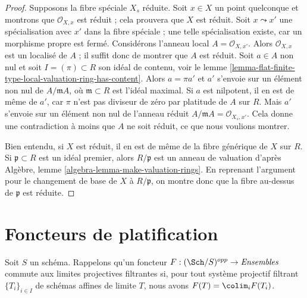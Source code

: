 \begin{proof}
Supposons la fibre spéciale $X_s$ réduite.
Soit $x \in X$ un point quelconque et montrons que $\mathcal{O}_{X, x}$
est réduit ; cela prouvera que $X$ est réduit.
Soit $x \leadsto x'$ une spécialisation avec $x'$
dans la fibre spéciale ; une telle spécialisation existe,
car un morphisme propre est fermé. Considérons l'anneau
local $A = \mathcal{O}_{X, x'}$. Alors $\mathcal{O}_{X, x}$
est un localisé de $A$ ; il suffit donc de montrer que
$A$ est réduit. Soit $a \in A$ non nul et soit $I = (\pi) \subset R$ son
idéal de contenu, voir le
lemme \ref{lemma-flat-finite-type-local-valuation-ring-has-content}.
Alors $a = \pi a'$ et $a'$ s'envoie sur un élément non nul de
$A/\mathfrak mA$, où $\mathfrak m \subset R$ est l'idéal maximal.
Si $a$ est nilpotent, il en est de même de $a'$, car $\pi$ n'est pas diviseur de zéro
par platitude de $A$ sur $R$.
Mais $a'$ s'envoie sur un élément non nul de l'anneau réduit
$A/\mathfrak m A = \mathcal{O}_{X_s, x'}$.
Cela donne une contradiction à moins que $A$ ne soit réduit, ce
que nous voulions montrer.

\medskip\noindent
Bien entendu, si $X$ est réduit, il en est de même de la fibre générique de $X$ sur $R$.
Si $\mathfrak p \subset R$ est un
idéal premier, alors $R/\mathfrak p$ est un anneau de valuation d'après
Algèbre, lemme \ref{algebra-lemma-make-valuation-rings}.
En reprenant l'argument pour le changement de base de $X$
à $R/\mathfrak p$, on montre donc que la fibre au-dessus de $\mathfrak p$
est réduite.
\end{proof}






\section{Foncteurs de platification}
\label{section-flattening-functors}

\noindent
Soit $S$ un schéma. Rappelons qu'un foncteur
$F : (\Sch/S)^{opp} \to \textit{Ensembles}$ commute aux limites projectives filtrantes
si, pour tout système projectif filtrant
$\{T_i\}_{i \in I}$ de schémas affines de limite $T$, nous avons
$F(T) = \colim_i F(T_i)$.

